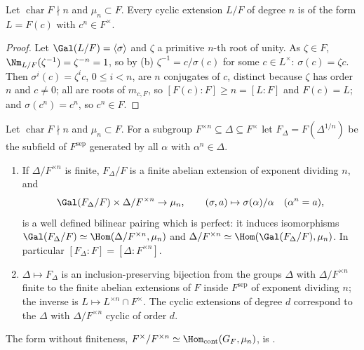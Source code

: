 \begin{theorem}\label{thm:galois:kummer-cyclic}
Let $\operatorname{char}F\nmid n$ and $\mu_n\subset F$. Every cyclic extension $L/F$ of degree $n$ is of the form $L=F(c)$ with $c^n\in F^\times$.
\end{theorem}

\begin{proof}
Let $\Gal(L/F)=\langle\sigma\rangle$ and $\zeta$ a primitive $n$-th root of unity. As $\zeta\in F$, $\Nm_{L/F}(\zeta^{-1})=\zeta^{-n}=1$, so by
(b) $\zeta^{-1}=c/\sigma(c)$ for some $c\in L^\times$: $\sigma(c)=\zeta c$. Then $\sigma^i(c)=\zeta^ic$, $0\le i<n$, are $n$ conjugates
of $c$, distinct because $\zeta$ has order $n$ and $c\ne0$; all are roots of $m_{c,F}$, so $[F(c):F]\ge n=[L:F]$ and $F(c)=L$; and $\sigma(c^n)=c^n$, so $c^n\in F$.
\end{proof}

\begin{theorem}\label{thm:galois:kummer}
Let $\operatorname{char}F\nmid n$ and $\mu_n\subset F$. For a subgroup $F^{\times n}\subseteq\Delta\subseteq F^\times$ let $F_\Delta=F(\Delta^{1/n})$ be the subfield of
$F^{\mathrm{sep}}$ generated by all $\alpha$ with $\alpha^n\in\Delta$.
\begin{enumerate}[label=(\alph*)]
\item If $\Delta/F^{\times n}$ is finite, $F_\Delta/F$ is a finite abelian extension of exponent dividing $n$, and
\[
\Gal(F_\Delta/F)\times\Delta/F^{\times n}\to\mu_n,\qquad(\sigma,a)\mapsto\sigma(\alpha)/\alpha\quad(\alpha^n=a),
\]
is a well defined bilinear pairing which is perfect: it induces isomorphisms $\Gal(F_\Delta/F)\simeq\Hom(\Delta/F^{\times n},\mu_n)$ and
$\Delta/F^{\times n}\simeq\Hom(\Gal(F_\Delta/F),\mu_n)$. In particular $[F_\Delta:F]=[\Delta:F^{\times n}]$.
\item $\Delta\mapsto F_\Delta$ is an inclusion-preserving bijection from the groups $\Delta$ with $\Delta/F^{\times n}$ finite to the finite abelian extensions of $F$ inside
$F^{\mathrm{sep}}$ of exponent dividing $n$; the inverse is $L\mapsto L^{\times n}\cap F^\times$. The cyclic extensions of degree $d$ correspond to the $\Delta$ with
$\Delta/F^{\times n}$ cyclic of order $d$.
\end{enumerate}
The form without finiteness, $F^\times/F^{\times n}\simeq\Hom_{\mathrm{cont}}(G_F,\mu_n)$, is .
\end{theorem}

